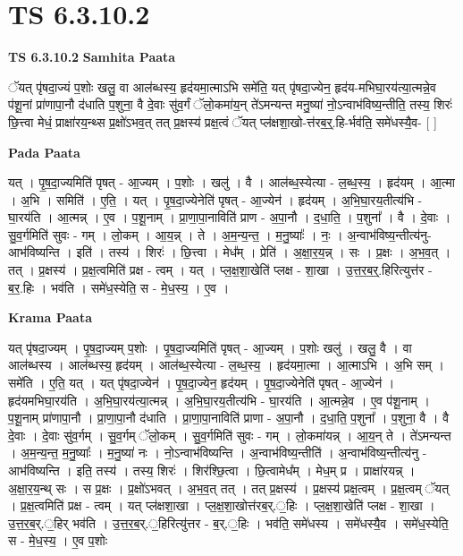 \documentclass[17pt]{extarticle}
\begin{document}
\section{ TS 6.3.10.2 }

\textbf{TS 6.3.10.2 } \newline
\textbf{Samhita Paata} \newline

ॅयत् पृ॑षदा॒ज्यं प॒शोः खलु॒ वा आल॑ब्धस्य॒ हृद॑यमा॒त्माऽभि समे॑ति॒ यत् पृ॑षदा॒ज्येन॒ हृद॑य-मभिघा॒रय॑त्या॒त्मन्ने॒व प॑शू॒नां प्रा॑णापा॒नौ द॑धाति प॒शुना॒ वै दे॒वाः सु॑व॒र्गं ॅलो॒कमा॑य॒न् ते॑ऽमन्यन्त मनु॒ष्या॑ नो॒ऽन्वाभ॑विष्य॒न्तीति॒ तस्य॒ शिरः॑ छि॒त्त्वा मेधं॒ प्राक्षा॑रय॒न्थ्स प्र॒क्षो॑ऽभव॒त् तत् प्र॒क्षस्य॑ प्रक्ष॒त्वं ॅयत् प्ल॑क्षशा॒खो-त्त॑रब॒र्॒.हि-र्भव॑ति॒ समे॑धस्यै॒व- [  ] \newline

\textbf{Pada Paata} \newline

यत् । पृ॒ष॒दा॒ज्यमिति॑ पृषत् - आ॒ज्यम् । प॒शोः । खलु॑ । वै । आल॑ब्ध॒स्येत्या - ल॒ब्ध॒स्य॒ । हृद॑यम् । आ॒त्मा । अ॒भि । समिति॑ । ए॒ति॒ । यत् । पृ॒ष॒दा॒ज्येनेति॑ पृषत् - आ॒ज्येन॑ । हृद॑यम् । अ॒भि॒घा॒रय॒तीत्य॑भि - घा॒रय॑ति । आ॒त्मन्न् । ए॒व । प॒शू॒नाम् । प्रा॒णा॒पा॒नाविति॑ प्राण - अ॒पा॒नौ । द॒धा॒ति॒ । प॒शुना᳚ । वै । दे॒वाः । सु॒व॒र्गमिति॑ सुवः - गम् । लो॒कम् । आ॒य॒न्न् । ते । अ॒म॒न्य॒न्त॒ । म॒नु॒ष्याः᳚ । नः॒ । अ॒न्वाभ॑विष्य॒न्तीत्य॑नु-आभ॑विष्यन्ति । इति॑ । तस्य॑ । शिरः॑ । छि॒त्त्वा । मेध᳚म् । प्रेति॑ । अ॒क्षा॒र॒य॒न्न् । सः । प्र॒क्षः । अ॒भ॒व॒त् । तत् । प्र॒क्षस्य॑ । प्र॒क्ष॒त्वमिति॑ प्रक्ष - त्वम् । यत् । प्ल॒क्ष॒शा॒खेति॑ प्लक्ष - शा॒खा । उ॒त्त॒र॒ब॒र्॒.हिरित्युत्त॑र - ब॒र॒.हिः । भव॑ति । समे॑ध॒स्येति॒ स - मे॒ध॒स्य॒ । ए॒व ।  \newline


\textbf{Krama Paata} \newline

यत् पृ॑षदा॒ज्यम् । पृ॒ष॒दा॒ज्यम् प॒शोः । पृ॒ष॒दा॒ज्यमिति॑ पृषत् - आ॒ज्यम् । प॒शोः खलु॑ । खलु॒ वै । वा आल॑ब्धस्य । आल॑ब्धस्य॒ हृद॑यम् । आल॑ब्ध॒स्येत्या - ल॒ब्ध॒स्य॒ । हृद॑यमा॒त्मा । आ॒त्माऽभि । अ॒भि सम् । समे॑ति । ए॒ति॒ यत् । यत् पृ॑षदा॒ज्येन॑ । पृ॒ष॒दा॒ज्येन॒ हृद॑यम् । पृ॒ष॒दा॒ज्येनेति॑ पृषत् - आ॒ज्येन॑ । हृद॑यमभिघा॒रय॑ति । अ॒भि॒घा॒रय॑त्या॒त्मन्न् । अ॒भि॒घा॒रय॒तीत्य॑भि - घा॒रय॑ति । आ॒त्मन्ने॒व । ए॒व प॑शू॒नाम् । प॒शू॒नाम् प्रा॑णापा॒नौ । प्रा॒णा॒पा॒नौ द॑धाति । प्रा॒णा॒पा॒नाविति॑ प्राणा - अ॒पा॒नौ । द॒धा॒ति॒ प॒शुना᳚ । प॒शुना॒ वै । वै दे॒वाः । दे॒वाः सु॑व॒र्गम् । सु॒व॒र्गम् ॅलो॒कम् । सु॒व॒र्गमिति॑ सुवः - गम् । लो॒कमा॑यन्न् । आ॒य॒न् ते । ते॑ऽमन्यन्त । अ॒म॒न्य॒न्त॒ म॒नु॒ष्याः᳚ । म॒नु॒ष्या॑ नः । नो॒ऽन्वाभ॑विष्यन्ति । अ॒न्वाभ॑विष्य॒न्तीति॑ । अ॒न्वाभ॑विष्य॒न्तीत्य॑नु - आभ॑विष्यन्ति । इति॒ तस्य॑ । तस्य॒ शिरः॑ । शिर॑श्छि॒त्वा । छि॒त्वामेध᳚म् । मेध॒म् प्र । प्राक्षा॑रयन्न् । अ॒क्षा॒र॒य॒न्थ् सः । स प्र॒क्षः । प्र॒क्षो॑ऽभवत् । अ॒भ॒व॒त् तत् । तत् प्र॒क्षस्य॑ । प्र॒क्षस्य॑ प्रक्ष॒त्वम् । प्र॒क्ष॒त्वम् ॅयत् । प्र॒क्ष॒त्वमिति॑ प्रक्ष - त्वम् । यत् प्ल॑क्षशा॒खा । प्ल॒क्ष॒शा॒खोत्त॑रब॒र्.॒हिः । प्ल॒क्ष॒शा॒खेति॑ प्लक्ष - शा॒खा । उ॒त्त॒र॒ब॒र्.॒हिर् भव॑ति । उ॒त्त॒र॒ब॒र्.॒हिरित्यु॑त्तर - ब॒र्.॒हिः । भव॑ति॒ समे॑धस्य । समे॑धस्यै॒व । समे॑ध॒स्येति॒ स - मे॒ध॒स्य॒ । ए॒व प॒शोः \newline
\end{document}

